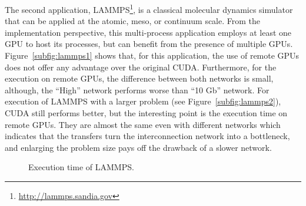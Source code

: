 \documentclass[a4paper,twoside]{article}
\begin{document}
The second application, LAMMPS\footnote{\url{http://lammps.sandia.gov}}, 
is a classical molecular dynamics simulator that can be applied at the atomic, 
meso, or continuum scale. 
From the implementation perspective, this multi-process application employs 
at least one GPU to host its processes, but can benefit from the presence of multiple GPUs.
Figure~\ref{subfig:lammps1} shows that, for this application, the use of remote GPUs 
does not offer any advantage over the original CUDA. 
Furthermore, for the execution on remote GPUs, the difference between both networks is small, although, the ``High'' network performs worse than ``10 Gb'' network.
For execution of LAMMPS with a larger problem (see Figure~\ref{subfig:lammps2}), CUDA still performs better, but the interesting point is the execution time on remote GPUs. 
They are almost the same even with different networks which indicates that the transfers turn the interconnection network into a bottleneck, and enlarging the problem size
pays off the drawback of a slower network.

\begin{figure}[htb]
\centering
{}
\quad
{}
\caption{Execution time of LAMMPS.}
\label{fig:lammps}
\end{figure}
\end{document}
